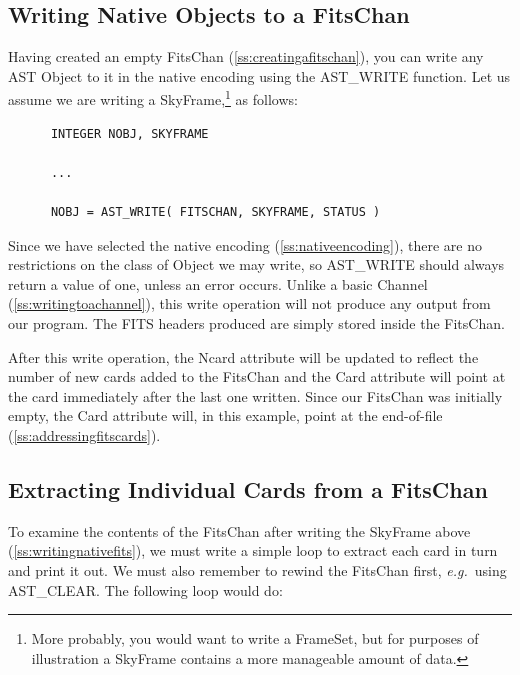 \documentclass[twoside,11pt]{article}
\newcommand{\htmlref}[2]{#1}
\newcommand{\secref}[1]{\S\ref{#1}}
\renewcommand{\secref}[1]{\ref{#1}}
\begin{document}
\subsection{\label{ss:writingnativefits}Writing Native Objects to a FitsChan}

Having created an empty \htmlref{FitsChan}{FitsChan} (\secref{ss:creatingafitschan}), you
can write any AST \htmlref{Object}{Object} to it in the native encoding using the
\htmlref{AST\_WRITE}{AST_WRITE} function. Let us assume we are writing a
\htmlref{SkyFrame}{SkyFrame},\footnote{More probably, you would want to write a \htmlref{FrameSet}{FrameSet},
but for purposes of illustration a SkyFrame contains a more manageable
amount of data.} as follows:

\small
\begin{verbatim}
      INTEGER NOBJ, SKYFRAME

      ...

      NOBJ = AST_WRITE( FITSCHAN, SKYFRAME, STATUS )
\end{verbatim}
\normalsize

Since we have selected the native encoding
(\secref{ss:nativeencoding}), there are no restrictions on the class
of Object we may write, so AST\_WRITE should always return a value of
one, unless an error occurs. Unlike a basic \htmlref{Channel}{Channel}
(\secref{ss:writingtoachannel}), this write operation will not produce
any output from our program. The FITS headers produced are simply
stored inside the FitsChan.

After this write operation, the \htmlref{Ncard}{Ncard} attribute will be updated to
reflect the number of new cards added to the FitsChan and the \htmlref{Card}{Card}
attribute will point at the card immediately after the last one
written. Since our FitsChan was initially empty, the Card attribute
will, in this example, point at the end-of-file
(\secref{ss:addressingfitscards}).

\subsection{\label{ss:extractingfitscards}Extracting Individual Cards from a FitsChan}

To examine the contents of the \htmlref{FitsChan}{FitsChan} after writing the \htmlref{SkyFrame}{SkyFrame}
above (\secref{ss:writingnativefits}), we must write a simple loop to
extract each card in turn and print it out. We must also remember to
rewind the FitsChan first, {\em{e.g.}}\ using \htmlref{AST\_CLEAR}{AST_CLEAR}. The
following loop would do:
\end{document}
